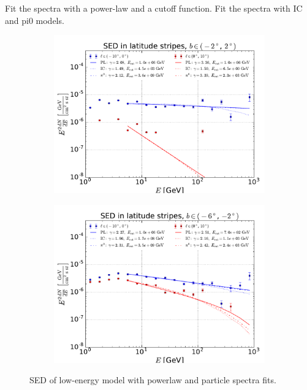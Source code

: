 Fit the spectra with a power-law and a cutoff function.
Fit the spectra with IC and pi0 models.

\begin{figure}[h!]
    \begin{subfigure}{0.5\textwidth}
        \includegraphics[width=\textwidth]{plots/SED_lowE_source_0cutoff.pdf}
    \end{subfigure} 
    \begin{subfigure}{0.5\textwidth}
        \includegraphics[width=\textwidth]{plots/SED_lowE_source_-4cutoff.pdf}
    \end{subfigure}
  	\caption{SED of low-energy model with powerlaw and particle spectra fits.}
  	\label{fig:SED_all}
\end{figure}


